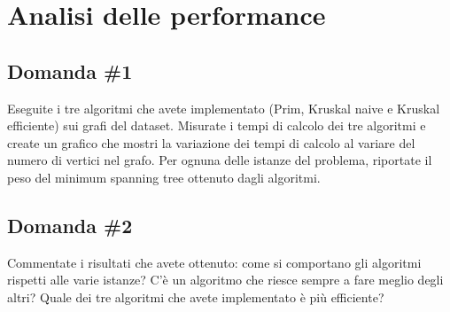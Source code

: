 \section{Analisi delle performance}
\label{cap:performance-analysis}

\subsection{Domanda \#1}

\begin{displayquote}
Eseguite i tre algoritmi che avete implementato (Prim, Kruskal naive e Kruskal efficiente) sui grafi del dataset. Misurate i tempi di calcolo dei tre algoritmi e create un grafico che mostri la variazione dei tempi di calcolo al variare del numero di vertici nel grafo. Per ognuna delle istanze del problema, riportate il peso del minimum spanning tree ottenuto dagli algoritmi. 
\end{displayquote}

\subsection{Domanda \#2}

\begin{displayquote}
Commentate i risultati che avete ottenuto: come si comportano gli algoritmi rispetti alle varie istanze? C'è un algoritmo che riesce sempre a fare meglio degli altri? Quale dei tre algoritmi che avete implementato è più efficiente? 
\end{displayquote}
